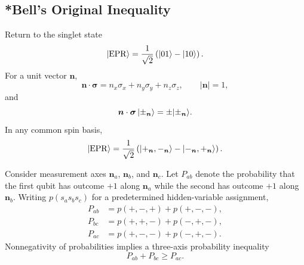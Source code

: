 \subsection{*Bell's Original Inequality}

Return to the singlet state
\begin{equation}
 |{\mathrm{EPR}}\rangle=\frac{1}{\sqrt2}\left(|{01}\rangle-|{10}\rangle\right).
\end{equation}
For a unit vector $\bm n$,
\begin{equation}
 \bm n\cdot\bm\sigma=n_x\sigma_x+n_y\sigma_y+n_z\sigma_z,
 \qquad |\bm n|=1,
\end{equation}
and
\begin{equation}
 \bm n\cdot\bm\sigma\,|{\pm_{\bm n}}\rangle
 =\pm|{\pm_{\bm n}}\rangle.
\end{equation}
In any common spin basis,
\begin{equation}
 |{\mathrm{EPR}}\rangle=\frac{1}{\sqrt2}\left(
 |{+_{\bm n},-_{\bm n}}\rangle-|{-_{\bm n},+_{\bm n}}\rangle
 \right).
\end{equation}

Consider measurement axes $\bm n_a$, $\bm n_b$, and $\bm n_c$. Let $P_{ab}$
denote the probability that the first qubit has outcome $+1$ along
$\bm n_a$ while the second has outcome $+1$ along $\bm n_b$. Writing
$p(s_as_bs_c)$ for a predetermined hidden-variable assignment,
\begin{align}
 P_{ab}&=p(+,-,+)+p(+,-,-),\\
 P_{bc}&=p(+,+,-)+p(-,+,-),\\
 P_{ac}&=p(+,-,-)+p(-,+,-).
\end{align}
Nonnegativity of probabilities implies a three-axis probability inequality
\begin{equation}
 \boxed{P_{ab}+P_{bc}\geq P_{ac}.}
\end{equation}


